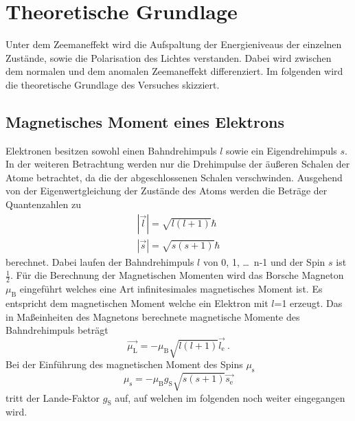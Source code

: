\section{Theoretische Grundlage}
\label{sec:Theorie}
Unter dem Zeemaneffekt wird die Aufspaltung der Energieniveaus der einzelnen Zustände, sowie die Polarisation des Lichtes verstanden. Dabei wird zwischen dem normalen und dem anomalen Zeemaneffekt differenziert. Im folgenden wird die theoretische Grundlage des Versuches skizziert.

\subsection{Magnetisches Moment eines Elektrons}
Elektronen besitzen sowohl einen Bahndrehimpuls $l$ sowie ein Eigendrehimpuls $s$. In der weiteren Betrachtung werden nur die Drehimpulse der äußeren Schalen der Atome betrachtet, da die der abgeschlossenen Schalen verschwinden. Ausgehend von der Eigenwertgleichung der Zustände des Atoms werden die Beträge der Quantenzahlen zu
\begin{eqnarray}
  |\vec{l}| = \sqrt{l(l+1)} \hbar  \\
  |\vec{s}| = \sqrt{s(s+1)} \hbar
  \label{eqn:betQua}
\end{eqnarray}
berechnet. Dabei laufen der Bahndrehimpuls $l$ von 0, 1, \ldots $\,$ n-1 und der Spin $s$ ist $\frac{1}{2}$. Für die Berechnung der Magnetischen Momenten wird das Borsche Magneton $\mu_\text{B}$ eingeführt welches eine Art infinitesimales magnetisches Moment ist. Es entspricht dem magnetischen Moment welche ein Elektron mit $l$=1 erzeugt. Das in Maßeinheiten des Magnetons berechnete magnetische Momente des Bahndrehimpuls beträgt
\begin{equation}
  \vec{\mu_\text{L}} = -\mu_\text{B} \sqrt{l(l+1)} \vec{l_\text{e}} \ .
  \label{eqn:magL}
\end{equation}
Bei der Einführung des magnetischen Moment des Spins $\mu_\text{s}$
\begin{equation}
  \mu_\text{s} = - \mu_\text{B} g_\text{S} \sqrt{s(s+1)} \vec{s_\text{e}}
  \label{eqn:magS}
\end{equation}
tritt der Lande-Faktor $g_\text{S}$ auf, auf welchen im folgenden noch weiter eingegangen wird.

